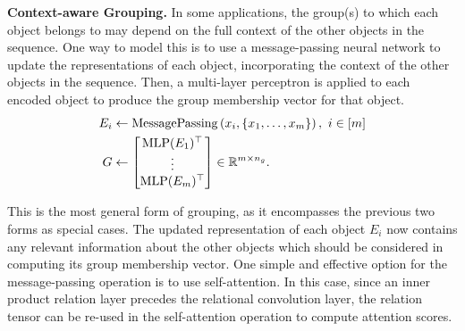 \textbf{Context-aware Grouping.} In some applications, the group(s) to which each object belongs to may depend on the full context of the other objects in the sequence. One way to model this is to use a message-passing neural network to update the representations of each object, incorporating the context of the other objects in the sequence. Then, a multi-layer perceptron is applied to each encoded object to produce the group membership vector for that object.
\begin{equation}
    \begin{split}
        E_i &\gets \mathrm{MessagePassing}\left(x_i, \left\{x_1, \ldots, x_m\right\}\right), \ i \in [m] \\
        G &\gets \begin{bmatrix}\mathrm{MLP}(E_1)^\top \\ \vdots \\ \mathrm{MLP}(E_m)^\top \end{bmatrix} \in \mathbb{R}^{m \times n_g}.
    \end{split}
\end{equation}

This is the most general form of grouping, as it encompasses the previous two forms as special cases. The updated representation of each object $E_i$ now contains any relevant information about the other objects which should be considered in computing its group membership vector. One simple and effective option for the message-passing operation is to use self-attention. In this case, since an inner product relation layer precedes the relational convolution layer, the relation tensor can be re-used in the self-attention operation to compute attention scores.
